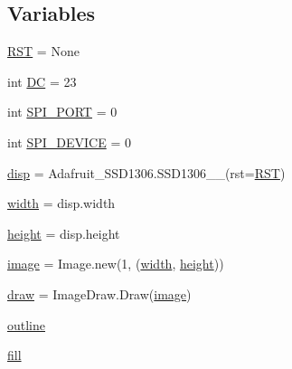 \subsection*{Variables}
\begin{DoxyCompactItemize}
\item 
\mbox{\hyperlink{namespacetoxic__hardware_1_1oled__interface_a3a9e2efeaf89528d45ac9a55c0aa0592}{R\+ST}} = None
\item 
int \mbox{\hyperlink{namespacetoxic__hardware_1_1oled__interface_a64c09f22bf1aaf06930f11f70d69b426}{DC}} = 23
\item 
int \mbox{\hyperlink{namespacetoxic__hardware_1_1oled__interface_aa08462d1cbc1c0ce2462199881e1515c}{S\+P\+I\+\_\+\+P\+O\+RT}} = 0
\item 
int \mbox{\hyperlink{namespacetoxic__hardware_1_1oled__interface_ae08d18f8f9a415753075d220a1bba561}{S\+P\+I\+\_\+\+D\+E\+V\+I\+CE}} = 0
\item 
\mbox{\hyperlink{namespacetoxic__hardware_1_1oled__interface_a4e72583d972515f4f5e30d98ce1eb739}{disp}} = Adafruit\+\_\+\+S\+S\+D1306.\+S\+S\+D1306\+\_\+\_(rst=\mbox{\hyperlink{namespacetoxic__hardware_1_1oled__interface_a3a9e2efeaf89528d45ac9a55c0aa0592}{R\+ST}})
\item 
\mbox{\hyperlink{namespacetoxic__hardware_1_1oled__interface_a5558ace5433f9aabbf0a0ec059900d94}{width}} = disp.\+width
\item 
\mbox{\hyperlink{namespacetoxic__hardware_1_1oled__interface_a509290c21d570ff479c1b9d9b1fe8810}{height}} = disp.\+height
\item 
\mbox{\hyperlink{namespacetoxic__hardware_1_1oled__interface_a42cb5f5737262947250c709931232c69}{image}} = Image.\+new(\textquotesingle{}1\textquotesingle{}, (\mbox{\hyperlink{namespacetoxic__hardware_1_1oled__interface_a5558ace5433f9aabbf0a0ec059900d94}{width}}, \mbox{\hyperlink{namespacetoxic__hardware_1_1oled__interface_a509290c21d570ff479c1b9d9b1fe8810}{height}}))
\item 
\mbox{\hyperlink{namespacetoxic__hardware_1_1oled__interface_a349ab7af971a4dba55c235814bbc3a9b}{draw}} = Image\+Draw.\+Draw(\mbox{\hyperlink{namespacetoxic__hardware_1_1oled__interface_a42cb5f5737262947250c709931232c69}{image}})
\item 
\mbox{\hyperlink{namespacetoxic__hardware_1_1oled__interface_a8d9e59eab21bcca5dfbf02faabf38f29}{outline}}
\item 
\mbox{\hyperlink{namespacetoxic__hardware_1_1oled__interface_a23b3ecc690a716b53e9d0146b78d5ef2}{fill}}
\item 

\end{DoxyCompactItemize}

